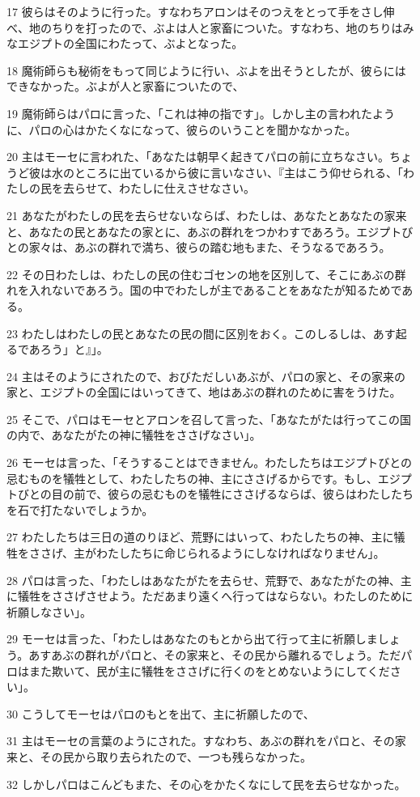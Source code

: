 \par 17 彼らはそのように行った。すなわちアロンはそのつえをとって手をさし伸べ、地のちりを打ったので、ぶよは人と家畜についた。すなわち、地のちりはみなエジプトの全国にわたって、ぶよとなった。
\par 18 魔術師らも秘術をもって同じように行い、ぶよを出そうとしたが、彼らにはできなかった。ぶよが人と家畜についたので、
\par 19 魔術師らはパロに言った、「これは神の指です」。しかし主の言われたように、パロの心はかたくなになって、彼らのいうことを聞かなかった。
\par 20 主はモーセに言われた、「あなたは朝早く起きてパロの前に立ちなさい。ちょうど彼は水のところに出ているから彼に言いなさい、『主はこう仰せられる、「わたしの民を去らせて、わたしに仕えさせなさい。
\par 21 あなたがわたしの民を去らせないならば、わたしは、あなたとあなたの家来と、あなたの民とあなたの家とに、あぶの群れをつかわすであろう。エジプトびとの家々は、あぶの群れで満ち、彼らの踏む地もまた、そうなるであろう。
\par 22 その日わたしは、わたしの民の住むゴセンの地を区別して、そこにあぶの群れを入れないであろう。国の中でわたしが主であることをあなたが知るためである。
\par 23 わたしはわたしの民とあなたの民の間に区別をおく。このしるしは、あす起るであろう」と』」。
\par 24 主はそのようにされたので、おびただしいあぶが、パロの家と、その家来の家と、エジプトの全国にはいってきて、地はあぶの群れのために害をうけた。
\par 25 そこで、パロはモーセとアロンを召して言った、「あなたがたは行ってこの国の内で、あなたがたの神に犠牲をささげなさい」。
\par 26 モーセは言った、「そうすることはできません。わたしたちはエジプトびとの忌むものを犠牲として、わたしたちの神、主にささげるからです。もし、エジプトびとの目の前で、彼らの忌むものを犠牲にささげるならば、彼らはわたしたちを石で打たないでしょうか。
\par 27 わたしたちは三日の道のりほど、荒野にはいって、わたしたちの神、主に犠牲をささげ、主がわたしたちに命じられるようにしなければなりません」。
\par 28 パロは言った、「わたしはあなたがたを去らせ、荒野で、あなたがたの神、主に犠牲をささげさせよう。ただあまり遠くへ行ってはならない。わたしのために祈願しなさい」。
\par 29 モーセは言った、「わたしはあなたのもとから出て行って主に祈願しましょう。あすあぶの群れがパロと、その家来と、その民から離れるでしょう。ただパロはまた欺いて、民が主に犠牲をささげに行くのをとめないようにしてください」。
\par 30 こうしてモーセはパロのもとを出て、主に祈願したので、
\par 31 主はモーセの言葉のようにされた。すなわち、あぶの群れをパロと、その家来と、その民から取り去られたので、一つも残らなかった。
\par 32 しかしパロはこんどもまた、その心をかたくなにして民を去らせなかった。

